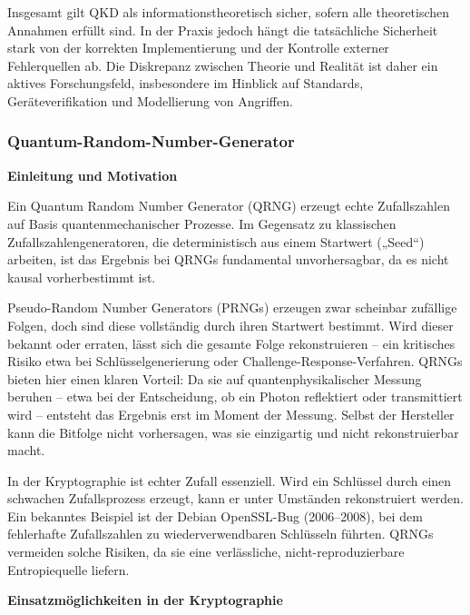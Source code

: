 \noindent
Insgesamt gilt QKD als informationstheoretisch sicher, sofern alle theoretischen Annahmen erfüllt sind. In der Praxis jedoch hängt die tatsächliche Sicherheit stark von der korrekten Implementierung und der Kontrolle externer Fehlerquellen ab. Die Diskrepanz zwischen Theorie und Realität ist daher ein aktives Forschungsfeld, insbesondere im Hinblick auf Standards, Geräteverifikation und Modellierung von Angriffen. \cite{mosca_et_al_cybersecurity_2018}


\subsubsection{Quantum-Random-Number-Generator}
\noindent\textbf{Einleitung und Motivation}

\noindent
Ein Quantum Random Number Generator (QRNG) erzeugt echte Zufallszahlen auf Basis quantenmechanischer Prozesse. Im Gegensatz zu klassischen Zufallszahlengeneratoren, die deterministisch aus einem Startwert („Seed“) arbeiten, ist das Ergebnis bei QRNGs fundamental unvorhersagbar, da es nicht kausal vorherbestimmt ist. \cite{herrero-collantes_et_al_quantum_2017}

\noindent
Pseudo-Random Number Generators (PRNGs) erzeugen zwar scheinbar zufällige Folgen, doch sind diese vollständig durch ihren Startwert bestimmt. Wird dieser bekannt oder erraten, lässt sich die gesamte Folge rekonstruieren – ein kritisches Risiko etwa bei Schlüsselgenerierung oder Challenge-Response-Verfahren.
QRNGs bieten hier einen klaren Vorteil: Da sie auf quantenphysikalischer Messung beruhen – etwa bei der Entscheidung, ob ein Photon reflektiert oder transmittiert wird – entsteht das Ergebnis erst im Moment der Messung. Selbst der Hersteller kann die Bitfolge nicht vorhersagen, was sie einzigartig und nicht rekonstruierbar macht. \cite{ma_x_et_al_quantum_2016}

\noindent
In der Kryptographie ist echter Zufall essenziell. Wird ein Schlüssel durch einen schwachen Zufallsprozess erzeugt, kann er unter Umständen rekonstruiert werden. Ein bekanntes Beispiel ist der Debian OpenSSL-Bug (2006–2008), bei dem fehlerhafte Zufallszahlen zu wiederverwendbaren Schlüsseln führten. QRNGs vermeiden solche Risiken, da sie eine verlässliche, nicht-reproduzierbare Entropiequelle liefern. \cite{herrero-collantes_et_al_quantum_2017, 2017}


\vspace{1em}
\noindent\textbf{Einsatzmöglichkeiten in der Kryptographie}

